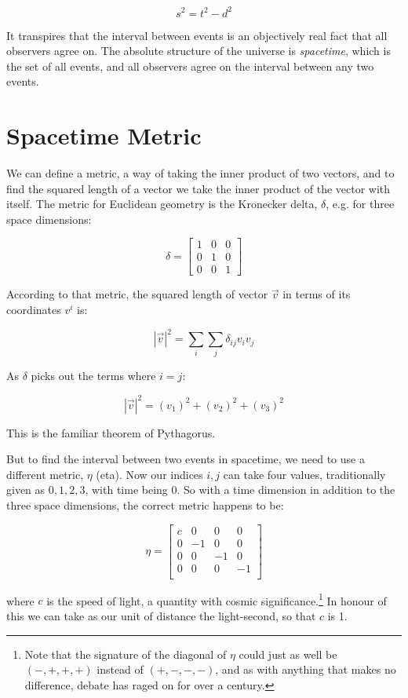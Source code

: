 $$s^2 = t^2 - d^2$$

It transpires that the interval between events is an objectively real fact that all observers agree on. The absolute structure of the universe is \textit{spacetime}, which is the set of all events, and all observers agree on the interval between any two events.

\section{Spacetime Metric}

We can define a metric, a way of taking the inner product of two vectors, and to find the squared length of a vector we take the inner product of the vector with itself. The metric for Euclidean geometry is the Kronecker delta, $\delta$, e.g. for three space dimensions:

$$
\delta =
\begin{bmatrix}
1 & 0 & 0 \\
0 & 1 & 0 \\
0 & 0 & 1
\end{bmatrix}
$$

According to that metric, the squared length of vector $\vec{v}$ in terms of its coordinates $v^i$ is:

$$|\vec{v}|^2 = \sum_i \sum_j \delta_{ij}v_iv_j$$

As $\delta$ picks out the terms where $i = j$:

$$|\vec{v}|^2 = (v_1)^2 + (v_2)^2 + (v_3)^2$$

This is the familiar theorem of Pythagorus.

But to find the interval between two events in spacetime, we need to use a different metric, $\eta$ (eta). Now our indices $i, j$ can take four values, traditionally given as $0, 1, 2, 3$, with time being $0$. So with a time dimension in addition to the three space dimensions, the correct metric happens to be:

$$
\eta =
\begin{bmatrix}
c & 0 & 0 & 0 \\
0 & -1 & 0 & 0 \\
0 & 0 & -1 & 0 \\
0 & 0 & 0 & -1 \\
\end{bmatrix}
$$

where $c$ is the speed of light, a quantity with cosmic significance.\footnote{Note that the signature of the diagonal of $\eta$ could just as well be $(-, +, +, +)$ instead of $(+, -, -, -)$, and as with anything that makes no difference, debate has raged on for over a century.} In honour of this we can take as our unit of distance the light-second, so that $c$ is 1.


